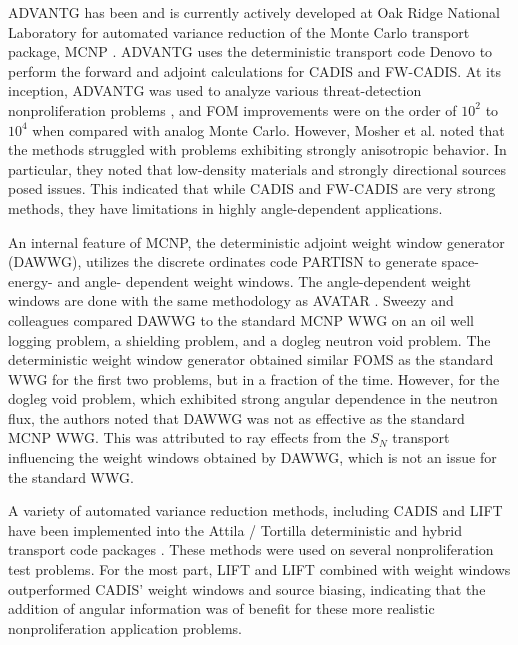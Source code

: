 ADVANTG \cite{mosher_automated_2009}
has been and is currently actively
developed at Oak Ridge National Laboratory \cite{mosher_new_2010,
wagner_review_2011, bevill_new_2012} for automated variance reduction of
the Monte Carlo transport package, MCNP \cite{mcnp_manual_v2}.
ADVANTG uses the deterministic
transport code Denovo \cite{evans_denovo:_2010} to perform the forward and
adjoint calculations for CADIS and FW-CADIS. At its inception, ADVANTG was used
to analyze various threat-detection nonproliferation problems
\cite{mosher_automated_2009}, and FOM improvements were on the order of $10^2$
to $10^4$ when compared with analog Monte Carlo. However, Mosher et al. noted
that the methods struggled with problems exhibiting strongly anisotropic
behavior. In particular, they noted that low-density materials and strongly
directional sources posed issues. This indicated that while CADIS and FW-CADIS
are very strong methods, they have limitations in highly angle-dependent
applications.

An internal feature of MCNP, the deterministic adjoint weight window generator
(DAWWG), utilizes the discrete ordinates code PARTISN
\cite{sweezy_automated_2005} to generate space- energy- and angle- dependent
weight windows. The angle-dependent weight windows are done with the same
methodology as AVATAR \cite{sweezy_automated_2005, van_riper_generation_1995}.
Sweezy and colleagues compared
DAWWG to the standard MCNP WWG on an oil well logging problem, a shielding
problem, and a dogleg neutron void problem. The deterministic weight window
generator obtained similar FOMS as the standard WWG for the first two problems,
but in a fraction of the time. However, for the dogleg void problem, which
exhibited strong angular dependence in the neutron flux,
the authors noted that DAWWG was not as effective as the
standard MCNP WWG. This was attributed to ray effects from the $S_N$ transport
influencing the weight windows obtained by DAWWG, which is not an issue for the
standard WWG.

A variety of automated variance reduction methods, including CADIS and LIFT have
been implemented into the Attila / Tortilla deterministic and hybrid transport
code packages \cite{somasundaram_implementation_2013}. These methods
were used on several
nonproliferation test problems. For the most part, LIFT and LIFT combined with
weight windows outperformed CADIS' weight windows and source biasing, indicating
that the addition of angular information was of benefit for these more realistic
nonproliferation application
problems.

